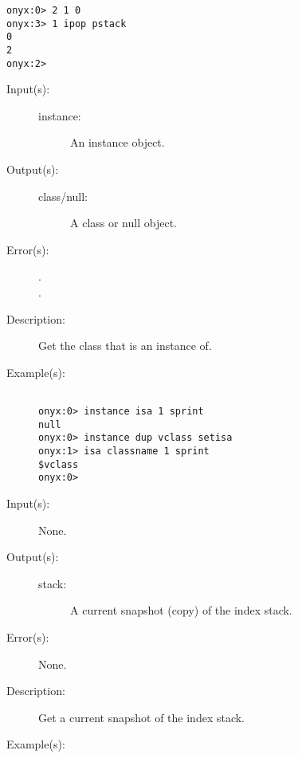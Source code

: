 \begin{description}
\begin{description}
\begin{verbatim}
onyx:0> 2 1 0
onyx:3> 1 ipop pstack
0
2
onyx:2>
		\end{verbatim}
	\end{description}
\label{systemdict:isa}
\item[{\onyxop{instance}{isa}{class/null}}: ]
	\begin{description}\item[]
	\item[Input(s): ]
		\begin{description}\item[]
		\item[instance: ]
			An instance object.
		\end{description}
	\item[Output(s): ]
		\begin{description}\item[]
		\item[class/null: ]
			A class or null object.
		\end{description}
	\item[Error(s): ]
		\begin{description}\item[]
		\item[.]
		\item[.]
		\end{description}
	\item[Description: ]
		Get the class  that  is an
		instance of.
	\item[Example(s): ]\begin{verbatim}

onyx:0> instance isa 1 sprint
null
onyx:0> instance dup vclass setisa
onyx:1> isa classname 1 sprint
$vclass
onyx:0>
		\end{verbatim}
	\end{description}
\label{systemdict:istack}
\item[{\onyxop{--}{istack}{stack}}: ]
	\begin{description}\item[]
	\item[Input(s): ] None.
	\item[Output(s): ]
		\begin{description}\item[]
		\item[stack: ]
			A current snapshot (copy) of the index stack.
		\end{description}
	\item[Error(s): ] None.
	\item[Description: ]
		Get a current snapshot of the index stack.
	\item[Example(s): ]\begin{verbatim}


\end{verbatim}
\end{description}
\end{description}
